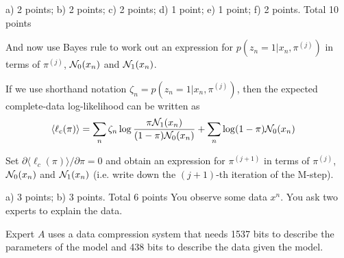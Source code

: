 \documentclass[a4paper]{article}
\newcommand{\tjboxed}[1]{}
\begin{document}
\begin{exam}
\begin{vraag}{a) 2 points; b) 2 points; c) 2 points; d) 1 point; e) 1 point; f) 2 points. Total 10 points}
\begin{deelvraag}
And now use Bayes rule to work out an expression for $p(z_n=1|x_n,\pi^{(j)})$ in terms of $\pi^{(j)}$, $\mathcal{N}_0(x_n)$ and $\mathcal{N}_1(x_n)$.
\tjboxed{
\begin{align*}
p(z_n=1|x_n,\pi^{(j)}) &= \frac{p(x_n|z_n=1)p(z_n=1|\pi^{(j)})}{\sum_k p(x_n|z_n=k)p(z_n=k|\pi^{(j)})}\\
    &=\frac{\pi^{(j)} \N_1(x_n)}{\pi^{(j)} \N_1(x_n) + (1-\pi^{(j)})\N_0(x_n)}
\end{align*}
}%
\end{deelvraag}

If we use shorthand notation $\zeta_n = p(z_n=1|x_n,\pi^{(j)})$, then the expected complete-data log-likelihood can be written as
\begin{align*}
\langle\ell_c(\pi)\rangle &=\sum_n \zeta_n\log \frac{\pi\mathcal{N}_1(x_n)}{(1-\pi)\mathcal{N}_0(x_n)} + \sum_n \log(1-\pi)\mathcal{N}_0(x_n)
\end{align*}

\begin{deelvraag}
Set $\partial \langle\ell_c(\pi)\rangle / \partial \pi=0$ and obtain an expression for $\pi^{(j+1)}$ in terms of $\pi^{(j)}$, $\mathcal{N}_0(x_n)$ and $\mathcal{N}_1(x_n)$ (i.e. write down the $(j+1)$-th iteration of the M-step).
\tjboxed{
\begin{align*}
\frac{\partial \langle\ell_c(\pi)\rangle}{  \partial \pi} &= \sum_n \frac{\zeta_n}{\pi} + \sum_n \frac{\zeta_n}{1-\pi} - \sum_n \frac{1}{1-\pi}\\
&= \frac{1}{\pi(1-\pi)}\sum_n\left( \zeta_n - n\pi\right)
\end{align*}
Set derivative to zero and it follows that
\begin{align*}
\pi^{(j+1)} &= \frac{1}{N}\sum_n \zeta_n\\
    &= \frac{\pi^{(j)} \N_1(x_n)}{\pi^{(j)} \N_1(x_n) + (1-\pi^{(j)})\N_0(x_n)}
\end{align*}
}%
\end{deelvraag}
\end{vraag}



\begin{vraag}{a) 3 points; b) 3 points. Total 6 points}
You observe some data $x^n$. You ask two experts to explain the data.

Expert $A$ uses a data compression system that needs 1537 bits to describe the parameters
of the model and 438 bits to describe the data given the model.


\end{vraag}
\end{exam}
\end{document}
